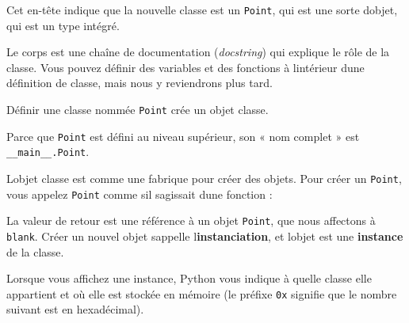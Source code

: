 Cet en-tête indique que la nouvelle classe est un \texttt{Point}, qui
est une sorte d\textquotesingle objet, qui est un type intégré.

Le corps est une chaîne de documentation (\emph{docstring}) qui explique
le rôle de la classe. Vous pouvez définir des variables et des fonctions
à l\textquotesingle intérieur d\textquotesingle une définition de
classe, mais nous y reviendrons plus tard.

Définir une classe nommée \texttt{Point} crée un objet classe.

\begin{Shaded}
\begin{Highlighting}[]
\OperatorTok{\textgreater{}\textgreater{}\textgreater{}} 
\OperatorTok{\textless{}} \OperatorTok{\textgreater{}}
\end{Highlighting}
\end{Shaded}

Parce que \texttt{Point} est défini au niveau supérieur, son « nom
complet » est \texttt{\_\_main\_\_.Point}.

L\textquotesingle objet classe est comme une fabrique pour créer des
objets. Pour créer un \texttt{Point}, vous appelez \texttt{Point} comme
s\textquotesingle il s\textquotesingle agissait d\textquotesingle une
fonction :

\begin{Shaded}
\begin{Highlighting}[]
\OperatorTok{\textgreater{}\textgreater{}\textgreater{}}\OperatorTok{=}
\OperatorTok{\textgreater{}\textgreater{}\textgreater{}} 
\OperatorTok{\textless{}}\OperatorTok{\textgreater{}}
\end{Highlighting}
\end{Shaded}

La valeur de retour est une référence à un objet \texttt{Point}, que
nous affectons à \texttt{blank}. Créer un nouvel objet
s\textquotesingle appelle l\textquotesingle{}\textbf{instanciation}, et
l\textquotesingle objet est une \textbf{instance} de la classe.

Lorsque vous affichez une instance, Python vous indique à quelle classe
elle appartient et où elle est stockée en mémoire (le préfixe
\texttt{0x} signifie que le nombre suivant est en hexadécimal).

